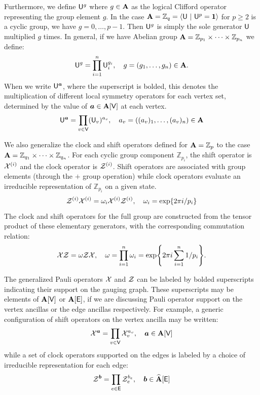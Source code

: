 \documentclass[11pt]{article}
\begin{document}
Furthermore, we define $\mathsf{U}^g$ where $g \in \mathbf{A}$ as the logical Clifford operator representing the group element $g$. In the case $\mathbf{A} = \mathbb{Z}_q = \langle \mathsf{U} ~|~ \mathsf{U}^p = \mathbf{1} \rangle$ for $p\geq 2$ is a cyclic group, we have $g = 0, \dots, p-1$. Then $\mathsf{U}^g$ is simply the sole generator $\mathsf{U}$ multiplied $g$ times. In general, if we have Abelian group $\mathbf{A} = \mathbb{Z}_{p_1} \times \cdots \times \mathbb{Z}_{p_n}$ we define:
\begin{equation}
    \mathsf{U}^g = \prod_{i=1}^n \mathsf{U}_i^{g_i}, \quad g = (g_1, \dots, g_n) \in \mathbf{A}.
\end{equation}
When we write $\mathsf{U}^{\bm{a}}$, where the superscript is bolded, this denotes the multiplication of different local symmetry operators for each vertex set, determined by the value of $\bm{a} \in \mathbf{A}[\mathsf{V}]$ at each vertex.
\begin{equation}
    \mathsf{U}^{\bm{a}} = \prod_{v \in \mathsf{V}} (\mathsf{U}_v)^{a_v}, \quad a_v =((a_v)_1, \dots, (a_v)_n) \in \mathbf{A}
\end{equation}

We also generalize the clock and shift operators defined for $\mathbf{A} = \mathbb{Z}_p$ to the case $\mathbf{A} = \mathbb{Z}_{q_1} \times \cdots \times \mathbb{Z}_{q_n}$. For each cyclic group component $\mathbb{Z}_{p_i}$, the shift operator is $\mathcal{X}^{(i)}$ and the clock operator is $\mathcal{Z}^{(i)}$. Shift operators are associated with group elements (through the $+$ group operation) while clock operators evaluate an irreducible representation of $\mathbb{Z}_{p_i}$ on a given state.
\begin{equation}
    \mathcal{Z}^{(i)} \mathcal{X}^{(i)} = \omega_i \mathcal{X}^{(i)} \mathcal{Z}^{(i)}, \quad \omega_i = \exp{2\pi i/p_i}
\end{equation}
The clock and shift operators for the full group are constructed from the tensor product of these elementary generators, with the corresponding commutation relation:
\begin{equation}
    \mathcal{X} \mathcal{Z} = \omega \mathcal{Z} \mathcal{X}, \quad \omega = \prod_{i = 1}^n \omega_i = \exp{2 \pi i \sum_{i = 1}^n 1/p_i} .
\end{equation}

The generalized Pauli operators $\mathcal{X}$ and $\mathcal{Z}$ can be labeled by bolded superscripts indicating their support on the gauging graph. These superscripts may be elements of $\mathbf{A}[\mathsf{V}]$ or $\mathbf{A}[\mathsf{E}]$, if we are discussing Pauli operator support on the vertex ancillas or the edge ancillas respectively. For example, a generic configuration of shift operators on the vertex ancilla may be written:
\begin{equation}
    \mathcal{X}^{\bm{a}} = \prod_{v \in \mathsf{V}} \mathcal{X}_v^{a_v}, \quad \bm{a} \in \mathbf{A}[\mathsf{V}]
\end{equation}
while a set of clock operators supported on the edges is labeled by a choice of irreducible representation for each edge:
\begin{equation}
    \mathcal{Z}^{\bm{b}} = \prod_{e \in \mathsf{E}} \mathcal{Z}_e^{b_e}, \quad \bm{b} \in \widehat{\mathbf{A}}[\mathsf{E}]
\end{equation}
\end{document}
